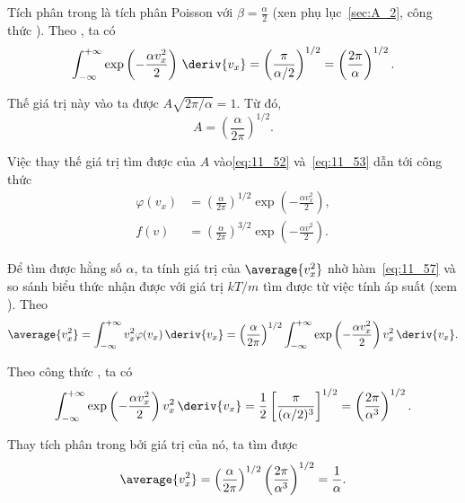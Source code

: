 Tích phân trong  là tích phân Poisson với $\beta=\frac{\alpha}{2}$ (xen phụ lục~\ref{sec:A_2}, công thức ). Theo , ta có
\begin{equation}\label{eq:11_55}
	\int_{-\infty}^{+\infty}  \exp\left(-\frac{\alpha v_x^2}{2}\right)\,\deriv{v_x} = \left(\frac{\pi}{\alpha/2}\right)^{1/2} = \left(\frac{2\pi}{\alpha}\right)^{1/2}.
\end{equation}

\noindent
Thế giá trị này vào ta được $A\sqrt{2\pi/\alpha}=1$. Từ đó,
\begin{equation}\label{eq:11_56}
	A = \left(\frac{\alpha}{2\pi}\right)^{1/2}.
\end{equation}

Việc thay thế giá trị tìm được của $A$ vào\eqref{eq:11_52} và~\eqref{eq:11_53} dẫn tới công thức
\begin{align}
	\varphi(v_x) &= \left(\frac{\alpha}{2\pi}\right)^{1/2} \exp\left(-\frac{\alpha v_x^2}{2}\right),\label{eq:11_57}\\
	f(v) &= \left(\frac{\alpha}{2\pi}\right)^{3/2} \exp\left(-\frac{\alpha v^2}{2}\right).\label{eq:11_58}
\end{align}

Để tìm được hằng số $\alpha$, ta tính giá trị của $\average{v_x^2}$ nhờ hàm~\eqref{eq:11_57} và so sánh biểu thức nhận được với giá trị $kT/m$ tìm được từ việc tính áp suất (xem ). Theo  
\begin{equation}\label{eq:11_59}
	\average{v_x^2} = \int_{-\infty}^{+\infty} v_x^2\varphi(v_x)\,\deriv{v_x} = \left(\frac{\alpha}{2\pi}\right)^{1/2} \int_{-\infty}^{+\infty} \exp\left(-\frac{\alpha v_x^2}{2}\right) v_x^2\,\deriv{v_x}.
\end{equation}

\noindent
Theo công thức , ta có
\begin{equation}\label{eq:11_60}
	\int_{-\infty}^{+\infty} \exp\left(-\frac{\alpha v_x^2}{2}\right) v_x^2\,\deriv{v_x} = \frac{1}{2}\left[\frac{\pi}{(\alpha/2)^3}\right]^{1/2} = \left(\frac{2\pi}{\alpha^3}\right)^{1/2}.
\end{equation}

Thay tích phân trong  bởi giá trị  của nó, ta tìm được
\begin{equation*}
	\average{v_x^2} = \left(\frac{\alpha}{2\pi}\right)^{1/2} \left(\frac{2\pi}{\alpha^3}\right)^{1/2} = \frac{1}{\alpha}.
\end{equation*}

